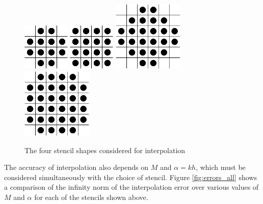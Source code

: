 \documentclass{report}
\begin{document}
\begin{figure}
  \begin{center}
    \includegraphics[width=0.2\textwidth]{figs/stencils/4x4_no_corners_centered.eps}
    \hspace{1.5 cm}
    \includegraphics[width=0.2\textwidth]{figs/stencils/4x4_centered.eps}
    \linebreak
    \linebreak
    \includegraphics[width=0.3\textwidth]{figs/stencils/4x4+2_centered.eps}
    \hspace{0.4 cm}
    \includegraphics[width=0.3\textwidth]{figs/stencils/6x6_no_corners_centered.eps}
    \caption{The four stencil shapes considered for interpolation}
    \label{fig:stencils}
  \end{center}
\end{figure}

The accuracy of interpolation also depends on $M$ and $\alpha = k h$, which must be considered simultaneously with the choice of stencil. Figure \ref{fig:errors_all} shows a comparison of the infinity norm of the interpolation error over various values of $M$ and $\alpha$ for each of the stencils shown above.
\end{document}
